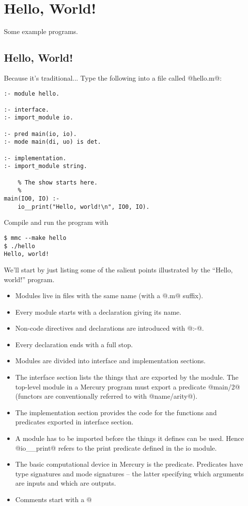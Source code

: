 
\chapter{Hello, World!}

Some example programs.



\section{Hello, World!}

Because it's traditional...  Type the following into a file called
@hello.m@:
\begin{verbatim}
:- module hello.

:- interface.
:- import_module io.

:- pred main(io, io).
:- mode main(di, uo) is det.

:- implementation.
:- import_module string.

    % The show starts here.
    %
main(IO0, IO) :-
    io__print("Hello, world!\n", IO0, IO).
\end{verbatim}
Compile and run the program with
\begin{verbatim}
$ mmc --make hello
$ ./hello
Hello, world!
\end{verbatim}
We'll start by just listing some of the salient points illustrated
by the ``Hello, world!'' program.
\begin{itemize}
\item Modules live in files with the same name (with a @.m@ suffix).
\item Every module starts with a declaration giving its name.
\item Non-code directives and declarations are introduced with @:-@.
\item Every declaration ends with a full stop.
\item Modules are divided into interface and implementation sections.
\item The interface section lists the things that are exported by the
  module.  The top-level module in a Mercury program must export a
  predicate @main/2@ (functors are conventionally referred to with
  @name/arity@).
\item The implementation section provides the code for the functions
  and predicates exported in interface section.
\item A module has to be imported before the things it defines can be
  used.  Hence @io__print@ refers to the print predicate defined in
  the io module.
\item The basic computational device in Mercury is the predicate.
  Predicates have type signatures and mode signatures -- the latter
  specifying which arguments are inputs and which are outputs.
\item Comments start with a @%
\end{itemize}

